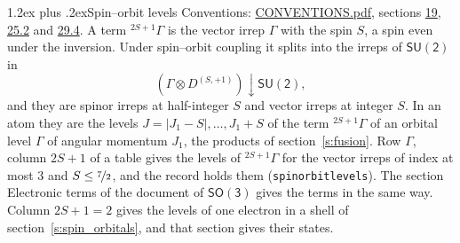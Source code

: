\documentclass[10pt,a4paper]{article}
\makeatletter
\renewcommand\section{\@startsection{section}{1}{\z@}{-3ex plus -1ex minus -.2ex}%
  {1.2ex plus .2ex}{\normalfont\large\sffamily\bfseries\color{parttitle}}}
\numberwithin{equation}{section}
\newcommand{\grp}[1]{\mathsf{#1}}
\newcommand{\restr}[2]{#1\!\downarrow#2}
\newcommand{\irrJp}[2]{D^{(#1,#2)}}
\newcommand{\irrprod}{\otimes}
\newcommand{\term}[2]{{}^{#1}#2}
\makeatother
\begin{document}
\section{Spin--orbit levels}\label{s:spin_orbit}
Conventions: \href{../../CONVENTIONS.pdf}{CONVENTIONS.pdf}, sections \href{../../../rotation/CONVENTIONS.pdf\#conv.19}{19}, \href{../../CONVENTIONS.pdf\#conv.25.2}{25.2} and \href{../../CONVENTIONS.pdf\#conv.29.4}{29.4}.
\leavevmode\label{n:local.spin}\label{n:symbol.term}A term $\term{2S+1}{\Gamma}$ is the vector irrep $\Gamma$ with the spin $S$, a spin even under the inversion. Under spin--orbit coupling it splits into the irreps of $\grp{SU(2)}$ in
\begin{equation}\label{e:spinorbit}\restr{(\Gamma \irrprod \irrJp{S}{+1})}{\grp{SU(2)}},\end{equation}
and they are spinor irreps at half-integer $S$ and vector irreps at integer $S$. In an atom they are the levels $J = \lvert J_1 - S\rvert, \dots, J_1 + S$ of the term $\term{2S+1}{\Gamma}$ of an orbital level $\Gamma$ of angular momentum $J_1$, the products of section~\ref{s:fusion}. Row $\Gamma$, column $2S + 1$ of a table gives the levels of $\term{2S+1}{\Gamma}$ for the vector irreps of index at most 3 and $S \le \nicefrac{7}{2}$, and the record holds them (\texttt{spinorbitlevels}). The section Electronic terms of the document of \href{../../../rotation/data/pdf/SO3.pdf}{$\grp{SO(3)}$} gives the terms in the same way. Column $2S + 1 = 2$ gives the levels of one electron in a shell of section~\ref{s:spin_orbitals}, and that section gives their states.
\end{document}

